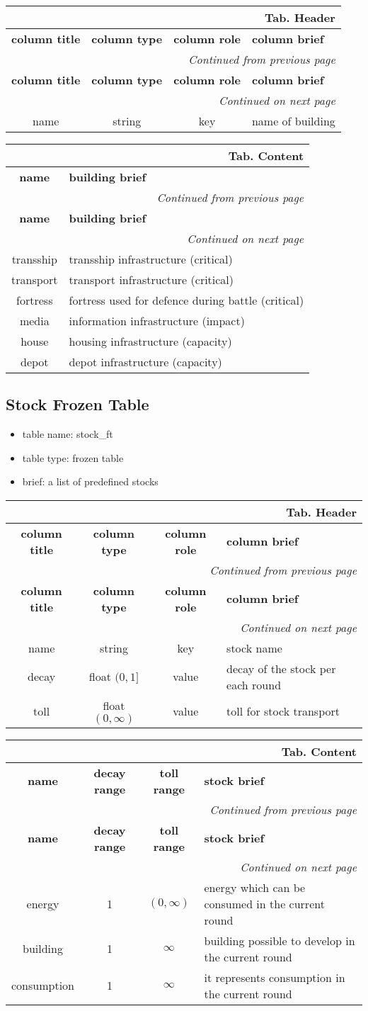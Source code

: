 \documentclass[a4paper,oneside,titlepage]{report}
\newcommand*{\LTHeaderII}[3]{
  \multicolumn{2}{r}{\textbf{Tab. \thesubsection} \textbf{#1}}\\    
  \hline
  \textbf{#2} & \textbf{#3}\\
  \hline

  \endfirsthead
  \multicolumn{2}{r}{\textit{Continued from previous page}}\\    
  \hline
  \textbf{#2} & \textbf{#3}\\
  \hline
  \endhead
  \hline
  \multicolumn{2}{r}{\textit{Continued on next page}}\\
  \endfoot
  \hline
  \endlastfoot  
}
\newcommand*{\LTHeaderIV}[5]{
  \multicolumn{4}{r}{\textbf{Tab. \thesubsection} \textbf{#1}}\\    
  \hline
  \textbf{#2} & \textbf{#3} & \textbf{#4} & \textbf{#5}\\
  \hline
  
  \endfirsthead
  \multicolumn{4}{r}{\textit{Continued from previous page}}\\    
  \hline
  \textbf{#2} & \textbf{#3} & \textbf{#4} & \textbf{#5}\\
  \hline
  \endhead
  \hline
  \multicolumn{4}{r}{\textit{Continued on next page}}\\
  \endfoot
  \hline
  \endlastfoot  
}
\begin{document}
\vspace{-0.5cm}
\begin{longtable}{ |c|c|c|l| } 
  \LTHeaderIV{Header}{column title}{column type}{column role}{column brief}
  name & string & key & name of building\\
\end{longtable}        

\vspace{-0.5cm}
\begin{longtable}{ |c|l| }    
  \LTHeaderII{Content}{name}{building brief}                    
  transship & transship infrastructure (critical)\\
  transport & transport infrastructure (critical)\\
  fortress & fortress used for defence during battle (critical)\\
  media & information infrastructure (impact)\\
  house & housing infrastructure (capacity)\\
  depot & depot infrastructure (capacity)\\
\end{longtable}

\subsection{Stock Frozen Table}
\begin{itemize}
  \setlength{\itemsep}{0pt}
  \setlength{\parskip}{0pt}
\item table name: stock\_ft  
\item table type: frozen table   
\item brief: a list of predefined stocks
\end{itemize}
\label{stock_ft}

\vspace{-0.5cm}
\begin{longtable}{ |c|c|c|l| } 
  \LTHeaderIV{Header}{column title}{column type}{column role}{column brief}
  name & string & key & stock name\\
  decay & float $(0, 1]$ & value & decay of the stock per each round\\
  toll & float $(0, \infty)$ & value & toll for stock transport\\
\end{longtable}        

\vspace{-0.5cm}
\begin{longtable}{ |c|c|c|l| }    
  \LTHeaderIV{Content}{name}{decay range}{toll range}{stock brief}                    
  energy & 1 & $(0, \infty)$ & energy which can be consumed in the current round\\
  building & 1 & $\infty$ & building possible to develop in the current round\\
  consumption & 1 & $\infty$  & it represents consumption in the current round\\
\end{longtable}
\end{document}
